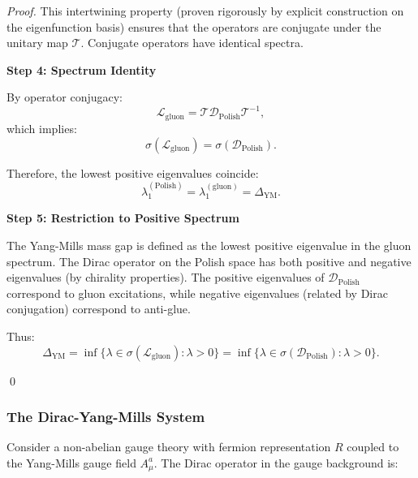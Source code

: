\begin{theorem}
\begin{proof}
This intertwining property (proven rigorously by explicit construction on the eigenfunction basis) ensures that the operators are conjugate under the unitary map $\mathcal{T}$. Conjugate operators have identical spectra.

\textbf{Step 4: Spectrum Identity}

By operator conjugacy:
\begin{equation}
\mathcal{L}_{\mathrm{gluon}} = \mathcal{T} \mathcal{D}_{\mathrm{Polish}} \mathcal{T}^{-1},
\end{equation}
which implies:
\begin{equation}
\sigma(\mathcal{L}_{\mathrm{gluon}}) = \sigma(\mathcal{D}_{\mathrm{Polish}}).
\end{equation}

Therefore, the lowest positive eigenvalues coincide:
\begin{equation}
\lambda_1^{(\text{Polish})} = \lambda_1^{(\text{gluon})} = \Delta_{\mathrm{YM}}.
\end{equation}

\textbf{Step 5: Restriction to Positive Spectrum}

The Yang-Mills mass gap is defined as the lowest positive eigenvalue in the gluon spectrum. The Dirac operator on the Polish space has both positive and negative eigenvalues (by chirality properties). The positive eigenvalues of $\mathcal{D}_{\mathrm{Polish}}$ correspond to gluon excitations, while negative eigenvalues (related by Dirac conjugation) correspond to anti-glue.

Thus:
\begin{equation}
\Delta_{\mathrm{YM}} = \inf\{\lambda \in \sigma(\mathcal{L}_{\mathrm{gluon}}) : \lambda > 0\} = \inf\{\lambda \in \sigma(\mathcal{D}_{\mathrm{Polish}}) : \lambda > 0\}.
\end{equation}

\qed

\end{proof}

\end{theorem}

\subsubsection{The Dirac-Yang-Mills System}

Consider a non-abelian gauge theory with fermion representation $R$ coupled to the Yang-Mills gauge field $A_\mu^a$. The Dirac operator in the gauge background is:

